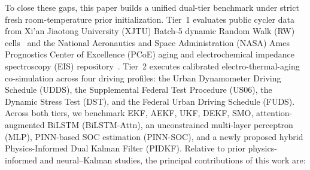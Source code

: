 \documentclass[10pt,a4paper]{article}
\begin{document}
To close these gaps, this paper builds a unified dual-tier benchmark under strict fresh room-temperature prior initialization. Tier~1 evaluates public cycler data from Xi'an Jiaotong University (XJTU) Batch-5 dynamic Random Walk (RW) cells~\cite{Wang2024xjtu} and the National Aeronautics and Space Administration (NASA) Ames Prognostics Center of Excellence (PCoE) aging and electrochemical impedance spectroscopy (EIS) repository~\cite{Saha2007nasa}. Tier~2 executes calibrated electro-thermal-aging co-simulation across four driving profiles: the Urban Dynamometer Driving Schedule (UDDS), the Supplemental Federal Test Procedure (US06), the Dynamic Stress Test (DST), and the Federal Urban Driving Schedule (FUDS). Across both tiers, we benchmark EKF, AEKF, UKF, DEKF, SMO, attention-augmented BiLSTM (BiLSTM-Attn), an unconstrained multi-layer perceptron (MLP), PINN-based SOC estimation (PINN-SOC), and a newly proposed hybrid Physics-Informed Dual Kalman Filter (PIDKF). Relative to prior physics-informed and neural--Kalman studies, the principal contributions of this work are:
\end{document}
